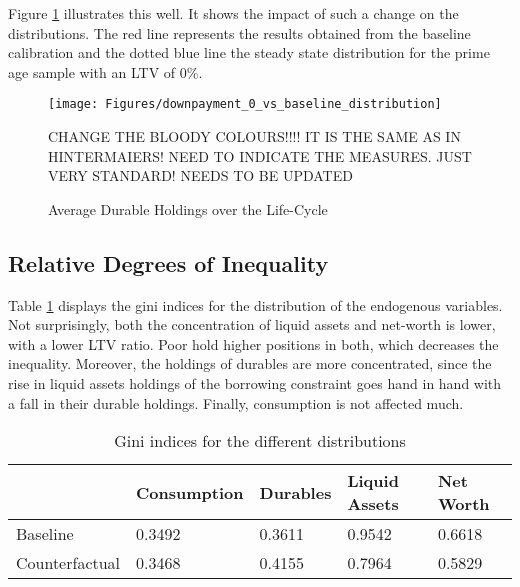 \documentclass[a4paper,12pt,legno]{article}
\begin{document}
Figure \ref{downpayment_vs_baseline} illustrates this well. It shows the impact of such a change on the distributions. The red line represents the results obtained from the baseline calibration and the dotted blue line the steady state distribution for the prime age sample with an LTV of 0\%. 

\begin{figure}[!htbp]
\caption{Average Durable Holdings over the Life-Cycle} 
\label{downpayment_vs_baseline}	%
\centering
\texttt{[image: Figures/downpayment\_0\_vs\_baseline\_distribution]}  %

\begin{minipage}{0.8\linewidth}
\footnotesize{CHANGE THE BLOODY COLOURS!!!! IT IS THE SAME AS IN HINTERMAIERS! NEED TO INDICATE THE MEASURES. JUST VERY STANDARD! NEEDS TO BE UPDATED}
\end{minipage}

\end{figure}

\subsection{Relative Degrees of Inequality}
Table \ref{Gini_Ranking_counter_factual} displays the gini indices for the distribution of the endogenous variables. Not surprisingly, both the concentration of liquid assets and net-worth is lower, with a lower LTV ratio. Poor hold higher positions in both, which decreases the inequality. Moreover, the holdings of durables are more concentrated, since the rise in liquid assets holdings of the borrowing constraint goes hand in hand with a fall in their durable holdings. Finally, consumption is not affected much. 

\begin{table}[!htbp]
\centering
\caption{Gini indices for the different distributions}
\label{Gini_Ranking_counter_factual}
\begin{tabular}{@{}lllll@{}}
\toprule
      & Consumption & Durables & Liquid Assets & Net Worth \\ \midrule
Baseline & 0.3492       & 0.3611   & 0.9542        & 0.6618    \\ \midrule
Counterfactual  & 0.3468         & 0.4155     & 0.7964          & 0.5829      \\ \bottomrule
\end{tabular}
\end{table}
\end{document}
